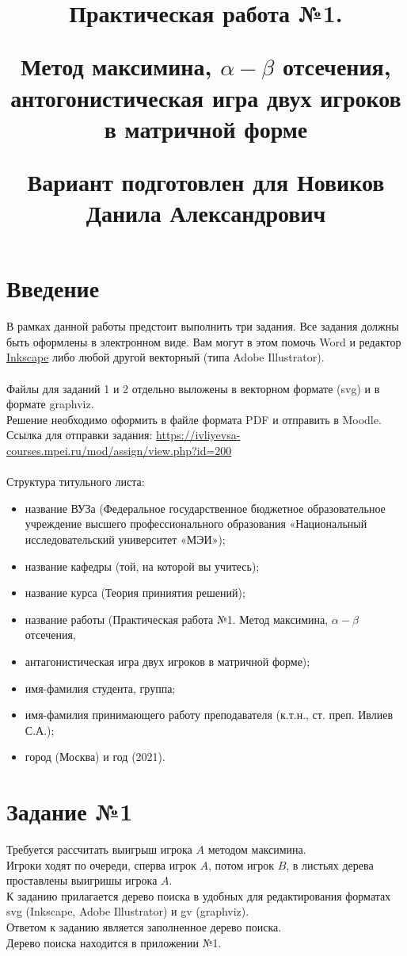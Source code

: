 \documentclass{article}
\title{Практическая работа №1.
    
Метод максимина, $\alpha-\beta$ отсечения, 
антогонистическая игра двух игроков в матричной форме

Вариант подготовлен для Новиков Данила Александрович}
\begin{document}
\maketitle

\section{Введение}

В рамках данной работы предстоит выполнить три задания. Все задания должны быть оформлены в электронном виде. 
Вам могут в этом помочь Word и редактор \href{https://inkscape.org/ }{Inkscape} либо любой другой векторный 
(типа Adobe Illustrator). \\\\
Файлы для заданий 1 и 2 отдельно выложены в векторном формате (svg) и в формате graphviz. \\
Решение необходимо оформить в файле формата PDF и отправить в Moodle. \\
Ссылка для отправки задания: \href{https://ivliyevsa-courses.mpei.ru/mod/assign/view.php?id=200}{https://ivliyevsa-courses.mpei.ru/mod/assign/view.php?id=200}\\\\
Структура титульного листа:
\begin{itemize}
\item название ВУЗа (Федеральное государственное бюджетное образовательное учреждение высшего 
профессионального образования «Национальный исследовательский университет «МЭИ»);
\item название кафедры (той, на которой вы учитесь);
\item название курса (Теория приниятия решений);
\item название работы (Практическая работа №1. Метод максимина, $\alpha-\beta$ отсечения, 
\item антагонистическая игра двух игроков в матричной форме);
\item имя-фамилия студента, группа;
\item имя-фамилия принимающего работу преподавателя (к.т.н., ст. преп. Ивлиев С.А.);
\item город (Москва) и год (2021).
\end{itemize}

\section{Задание №1}

Требуется рассчитать выигрыш игрока $A$ методом максимина. \\
Игроки ходят по очереди, сперва игрок $A$, 
потом игрок $B$, в листьях дерева проставлены выигришы игрока $A$.\\
К заданию прилагается дерево поиска в удобных для редактирования форматах svg (Inkscape, Adobe Illustrator) 
и gv (graphviz). \\
Ответом к заданию является заполненное дерево поиска. \\
Дерево поиска находится в приложении №1.
\end{document}
